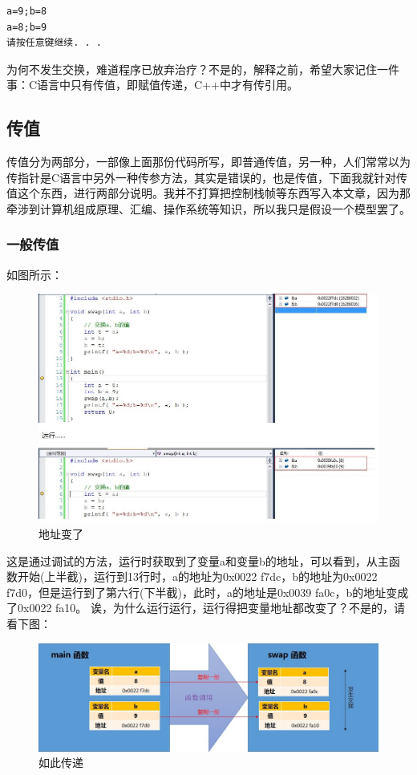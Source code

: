\documentclass[11pt,twoside,a4paper,titlepage]{article}	%
\begin{document}
\begin{lstlisting}
a=9;b=8
a=8;b=9
请按任意键继续. . .
\end{lstlisting}

为何不发生交换，难道程序已放弃治疗？不是的，解释之前，希望大家记住一件事：{\color{red}C语言中只有传值，即赋值传递，C++中才有传引用。}

\subsection{传值}
传值分为两部分，一部像上面那份代码所写，即普通传值，另一种，人们常常以为传指针是C语言中另外一种传参方法，其实是错误的，也是传值，下面我就针对传值这个东西，进行两部分说明。我并不打算把控制栈帧等东西写入本文章，因为那牵涉到计算机组成原理、汇编、操作系统等知识，所以我只是假设一个模型罢了。

\subsubsection{一般传值}

如图所示：

\begin{figure}[H]
\centering
\includegraphics[scale=.6]{../src/swap_01.jpg}
\caption{地址变了}
\label{fig:swap_01}
\end{figure}

这是通过调试的方法，运行时获取到了变量a和变量b的地址，可以看到，从主函数开始(上半截)，运行到13行时，a的地址为0x0022 f7dc，b的地址为0x0022 f7d0，但是运行到了第六行(下半截)，此时，a的地址是0x0039 fa0c，b的地址变成了0x0022 fa10。 诶，为什么运行运行，运行得把变量地址都改变了？不是的，请看下图：

\begin{figure}[bpht]
\centering
\includegraphics[scale=.5]{../src/swap_02.jpg}
\caption{如此传递}
\label{fig:swap_02}
\end{figure}
\end{document}
